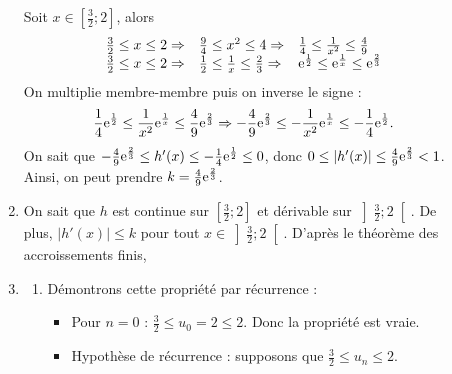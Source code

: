 \begin{description}
\begin{enumerate}
						Soit $x\in \left[ \frac{3}{2} ; 2 \right]$, alors 
						\[
							\begin{array}{lll}
								\frac{3}{2} \leq x \leq 2 
									\Rightarrow & \frac{9}{4} \leq x^2 \leq 4 
										\Rightarrow & \frac{1}{4} \leq \frac{1}{x^2} \leq \frac{4}{9}
											\\
								\frac{3}{2} \leq x \leq 2 
									\Rightarrow & \frac{1}{2} \leq \frac{1}{x} \leq \frac{2}{3}
										\Rightarrow & \expo{\frac{1}{2}} \leq \expo{\frac{1}{x}} \leq \expo{\frac{2}{3}}
							\end{array}
						\]
						On multiplie membre-membre puis on inverse le signe :
						\[
							\frac{1}{4} \expo{\frac{1}{2}} 
								\leq \frac{1}{x^2} \expo{\frac{1}{x}} 
									\leq \frac{4}{9} \expo{\frac{2}{3}}
							\Rightarrow
							-\frac{4}{9} \expo{\frac{2}{3}}
								\leq -\frac{1}{x^2} \expo{\frac{1}{x}} 
									\leq -\frac{1}{4} \expo{\frac{1}{2}} .
						\]
				\vln{Existence d'un r\'eel $k\in]0;1[$ :}
						On sait que 
					$-\frac{4}{9} \expo{\frac{2}{3}} \leq h'(x) \leq -\frac{1}{4} \expo{\frac{1}{2}} \leq 0$,
						donc 
						$0 \leq |h'(x)| \leq \frac{4}{9} \expo{\frac{2}{3}} < 1$.
						Ainsi, on peut prendre $k = \frac{4}{9} \expo{\frac{2}{3}}$.
			\item {}
				On sait que $h$ est continue sur $\left[\frac{3}{2} ; 2 \right]$ 
				et d\'erivable sur $\left] \frac{3}{2} ; 2 \right[$.
				De plus, $|h'(x)| \leq k$ pour tout $x \in \left] \frac{3}{2} ; 2 \right[$.
					D'apr\`es le th\'eor\`eme des accroissements finis,
					\par\noindent{}
				\label{quest: Bac C 2003, pbm II, part B, 3/}
			\item 
				\begin{enumerate}
					\item {}
						D\'emontrons cette propri\'et\'e par r\'ecurrence :
						\begin{itemize}
							\item Pour $n = 0$ : $\frac{3}{2} \leq u_0 = 2 \leq 2$. Donc la propri\'et\'e est vraie.
							\item Hypoth\`ese de r\'ecurrence : supposons que $\frac{3}{2} \leq u_n \leq 2$.

\end{itemize}
\end{enumerate}
\end{enumerate}
\end{description}

